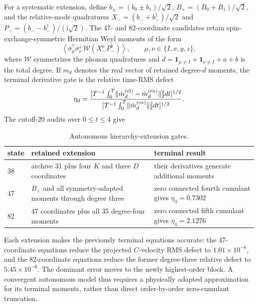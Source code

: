 \documentclass[10pt,twocolumn]{article}
\newcommand{\ii}{\mathrm i}
\newcommand{\norm}[1]{\lVert#1\rVert}
\begin{document}
For a systematic extension, define
$b_\pm=(b_0\pm b_1)/\sqrt2$, $B_+=(B_0+B_1)/\sqrt2$, and the relative-mode quadratures
$X_-=(b_-+b_-^\dagger)/\sqrt2$ and
$P_-=(b_--b_-^\dagger)/(\ii\sqrt2)$.  The 47- and 82-coordinate candidates
retain spin-exchange-symmetric Hermitian Weyl moments of the form
\begin{equation}
\left\langle\sigma_\mu^\uparrow\sigma_\nu^\downarrow
\,\mathcal W(X_-^aP_-^b)\right\rangle,
\qquad \mu,\nu\in\{I,x,y,z\},
\label{eq:weyl-hierarchy}
\end{equation}
where $\mathcal W$ symmetrizes the phonon quadratures and
$d=\mathbf 1_{\mu\ne I}+\mathbf 1_{\nu\ne I}+a+b$ is the total degree.  If
$m_d$ denotes the real vector of retained degree-$d$ moments, the terminal derivative gate is
the relative time-RMS defect
\begin{equation}
\eta_d=
\frac{[T^{-1}\int_0^T\norm{\dot m_d^{\rm(cl)}-
\dot m_d^{\rm(ex)}}_2^2dt]^{1/2}}
{[T^{-1}\int_0^T\norm{\dot m_d^{\rm(ex)}}_2^2dt]^{1/2}}.
\label{eq:terminal-gate}
\end{equation}
The cutoff-20 audits over $0\leq t\leq4$ give
\begin{table}[H]
\centering
\scriptsize
\begin{tabular}{@{}lp{}p{}@{}}
\toprule
state & retained extension & terminal result\\
\midrule
38 & archive 31 plus four $K$ and three $D$ coordinates
& their derivatives generate additional moments\\
47 & $B_+$ and all symmetry-adapted moments through degree three
& zero connected fourth cumulant gives $\eta_3=0.7302$\\
82 & 47 coordinates plus all 35 degree-four moments
& zero connected fifth cumulant gives $\eta_4=2.1276$\\
\bottomrule
\end{tabular}
\caption{Autonomous hierarchy-extension gates.}
\label{tab:hierarchy-gates}
\end{table}
Each extension makes the previously terminal equations accurate: the
47-coordinate equations reduce the projected $C$-velocity RMS defect to
$1.01\times10^{-6}$, and the 82-coordinate equations reduce the former
degree-three relative defect to $5.45\times10^{-6}$.  The dominant error
moves to the newly highest-order block.  A convergent autonomous model thus
requires a physically adapted approximation for its terminal moments, rather
than direct order-by-order zero-cumulant truncation.
\end{document}
